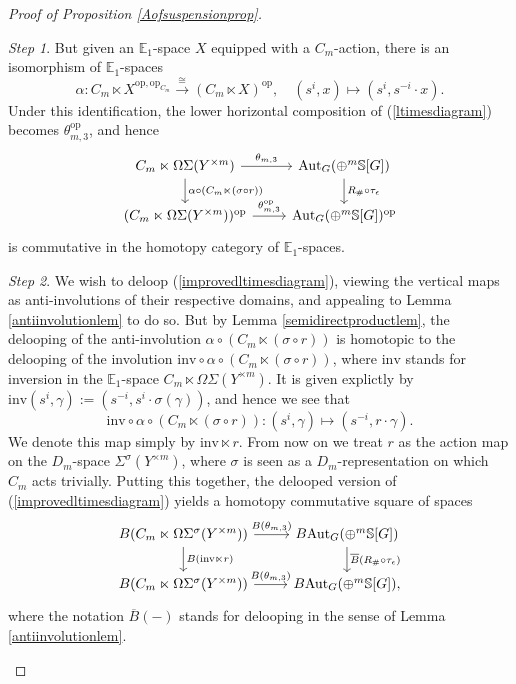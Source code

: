 \documentclass[a4paper, oneside]{amsart}
\newcommand{\1}{\mathds{1}}
\theoremstyle{remark}
\newtheorem{step}{Step}
\theoremstyle{definition}
\newcommand{\s}{\mathbb{S}}
\numberwithin{equation}{section}
\begin{document}
\begin{proof}[Proof of Proposition \ref{Aofsuspensionprop}]
\begin{step}
But given an $\mathbb{E}_1$-space $X$ equipped with a $C_m$-action, there is an isomorphism of $\mathbb{E}_1$-spaces
$$
\alpha:C_m\ltimes X^{\mathrm{op},\mathrm{op}_{C_m}}\overset\cong\longrightarrow (C_m\ltimes X)^{\mathrm{op}}, \quad (s^{i},x)\longmapsto (s^{i},s^{-i}\cdot x).
$$
Under this identification, the lower horizontal composition of (\ref{ltimesdiagram}) becomes $\theta_{m,3}^{\mathrm{op}}$, and hence
\begin{equation}\label{improvedltimesdiagram}
\begin{tikzcd}
    C_m\ltimes\Omega\Sigma(Y^{\times m})\dar["\alpha\circ(C_m\ltimes (\sigma\circ r))"]\rar["\theta_{m,3}"] & \mathrm{Aut}_G(\oplus^m\s[G])\dar["R_\#\circ\tau_\epsilon"]\\
    (C_m\ltimes \Omega\Sigma(Y^{\times m}))^{\mathrm{op}}\rar["\theta_{m,3}^{\mathrm{op}}"] & \mathrm{Aut}_G(\oplus^m\s[G])^{\mathrm{op}}
\end{tikzcd}
\end{equation}
is commutative in the homotopy category of $\mathbb{E}_1$-spaces.
\end{step}


\begin{step}
We wish to deloop (\ref{improvedltimesdiagram}), viewing the vertical maps as anti-involutions of their respective domains, and appealing to Lemma \ref{antiinvolutionlem} to do so. But by Lemma \ref{semidirectproductlem}, the delooping of the anti-involution $\alpha\circ(C_m\ltimes(\sigma\circ r))$ is homotopic to the delooping of the involution $\mathrm{inv}\circ\alpha\circ(C_m\ltimes(\sigma\circ r))$, where $\mathrm{inv}$ stands for inversion in the $\mathbb{E}_1$-space $C_m\ltimes\Omega\Sigma(Y^{\times m})$. It is given explictly by $\mathrm{inv}(s^{i},\gamma):=(s^{-i},s^{i}\cdot\sigma(\gamma))$, and hence we see that 
$$
\mathrm{inv}\circ\alpha\circ(C_m\ltimes(\sigma\circ r)):(s^{i},\gamma)\longmapsto (s^{-i},r\cdot \gamma).
$$
We denote this map simply by $\mathrm{inv}\ltimes r$. From now on we treat $r$ as the action map on the $D_m$-space $\Sigma^{\sigma}(Y^{\times m})$, where $\sigma$ is seen as a $D_m$-representation on which $C_m$ acts trivially. Putting this together, the delooped version of (\ref{improvedltimesdiagram}) yields a homotopy commutative square of spaces
$$
\begin{tikzcd}
    B(C_m\ltimes \Omega\Sigma^{\sigma}(Y^{\times m}))\dar["B(\mathrm{inv}\ltimes r)"]\rar["B(\theta_{m,3})"] & B\mathrm{Aut}_G(\oplus^m\s[G])\dar["\overline{B}(R_\#\circ\tau_\epsilon)"]\\
    B(C_m\ltimes \Omega\Sigma^{\sigma}(Y^{\times m}))\rar["B(\theta_{m,3})"] & B\mathrm{Aut}_G(\oplus^m\s[G]),
\end{tikzcd}
$$
where the notation $\overline{B}(-)$ stands for delooping in the sense of Lemma \ref{antiinvolutionlem}. 


\end{step}
\end{proof}
\end{document}
